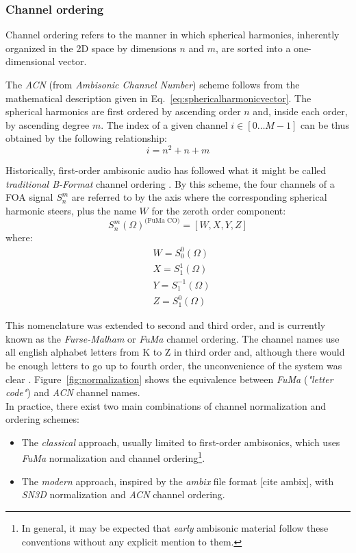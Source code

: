 \subsubsection{Channel ordering}

Channel ordering refers to the manner in which spherical harmonics, inherently organized in the 2D space by dimensions $n$ and $m$, are sorted into a one-dimensional vector. 

The \textit{ACN} (from \textit{Ambisonic Channel Number}) scheme follows from the mathematical description given in Eq.~\ref{eq:sphericalharmonicvector}. The spherical harmonics are first ordered by ascending order $n$ and, inside each order, by ascending degree $m$. The index of a given channel $i \in [0 \ldots M-1]$ can be thus obtained by the following relationship:
\begin{equation}
	i = n^2 + n + m 
\end{equation}

Historically, first-order ambisonic audio has followed what it might be called \textit{traditional B-Format} channel ordering \cite{gerzon1985ambisonics}. 
By this scheme, the four channels of a FOA signal $S_n^m$ are referred to by the axis where the corresponding spherical harmonic steers, plus the name $W$ for the zeroth order component:
\begin{equation}
	{S_n^m(\Omega)}^{\text{(FuMa CO)}} = [W, X, Y, Z]
\label{eq:fumaordering}
\end{equation}
where:
\begin{equation}
\begin{aligned}
	&W = S_0^0(\Omega) \\
	&X = S_1^1(\Omega) \\
	&Y = S_1^{-1}(\Omega) \\
	&Z = S_1^0(\Omega)
\end{aligned}	
\end{equation}

This nomenclature was extended to second and third order, and is currently known as the \textit{Furse-Malham} or \textit{FuMa} channel ordering. The channel names use all english alphabet letters from K to Z in third order and, although there would be enough letters to go up to fourth order, the unconvenience of the system was clear \cite{malham2003higher}.
Figure~\ref{fig:normalization} shows the equivalence between \textit{FuMa} (\textit{"letter code"}) and \textit{ACN} channel names.\\


In practice, there exist two main combinations of channel normalization and ordering schemes:
\begin{itemize}
  \item The \textit{classical} approach, usually limited to first-order ambisonics, which uses \textit{FuMa} normalization and channel ordering\footnote{In general, it may be expected that \textit{early} ambisonic material follow these conventions without any explicit mention to them.}.
  \item The \textit{modern} approach, inspired by the \textit{ambix} file format [cite ambix], with \textit{SN3D} normalization and \textit{ACN} channel ordering.
\end{itemize}


